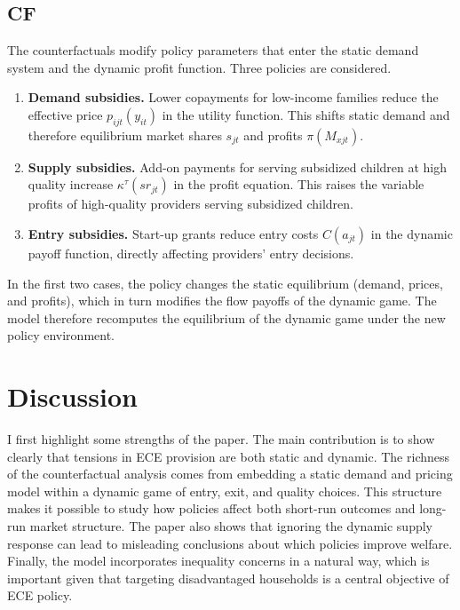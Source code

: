 \documentclass{article}
\begin{document}
\subsection{CF}
The counterfactuals modify policy parameters that enter the static demand system and the dynamic profit function. Three policies are considered.

\begin{enumerate}
    \item \textbf{Demand subsidies.} Lower copayments for low-income families reduce the effective price $p_{ijt}(y_{it})$ in the utility function. This shifts static demand and therefore equilibrium market shares $s_{jt}$ and profits $\pi(M_{xjt})$.

    \item \textbf{Supply subsidies.} Add-on payments for serving subsidized children at high quality increase $\kappa^{\tau}(sr_{jt})$ in the profit equation. This raises the variable profits of high-quality providers serving subsidized children.

    \item \textbf{Entry subsidies.} Start-up grants reduce entry costs $C(a_{jt})$ in the dynamic payoff function, directly affecting providers’ entry decisions.
\end{enumerate}

In the first two cases, the policy changes the static equilibrium (demand, prices, and profits), which in turn modifies the flow payoffs of the dynamic game. The model therefore recomputes the equilibrium of the dynamic game under the new policy environment. 

\section{Discussion}

I first highlight some strengths of the paper. The main contribution is to show clearly that tensions in ECE provision are both static and dynamic. The richness of the counterfactual analysis comes from embedding a static demand and pricing model within a dynamic game of entry, exit, and quality choices. This structure makes it possible to study how policies affect both short-run outcomes and long-run market structure. The paper also shows that ignoring the dynamic supply response can lead to misleading conclusions about which policies improve welfare. Finally, the model incorporates inequality concerns in a natural way, which is important given that targeting disadvantaged households is a central objective of ECE policy.
\end{document}
